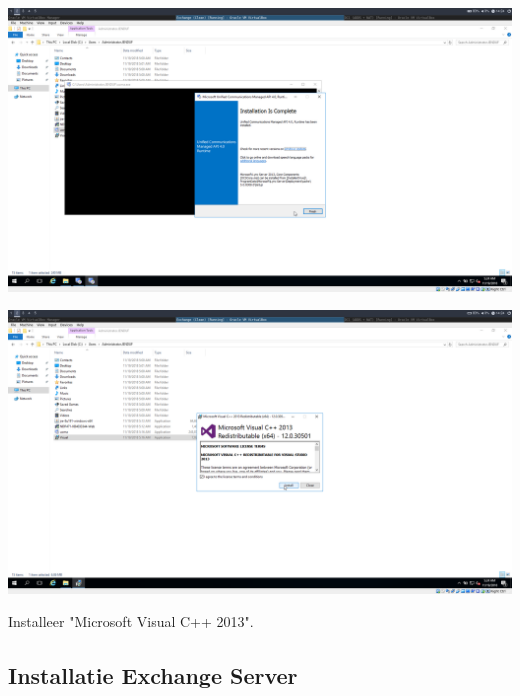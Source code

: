 \documentclass[a4paper]{article}
\begin{document}
	\begin{center}
	\includegraphics[width=15cm]{Pictures/Exchange/Pre/1542633844.png}
\end{center}
	\begin{center}
	\includegraphics[width=15cm]{Pictures/Exchange/Pre/1542633852.png}
	
	Installeer "Microsoft Visual C++ 2013".
	
\subsection{Installatie Exchange Server}	
\end{center}
\end{document}
